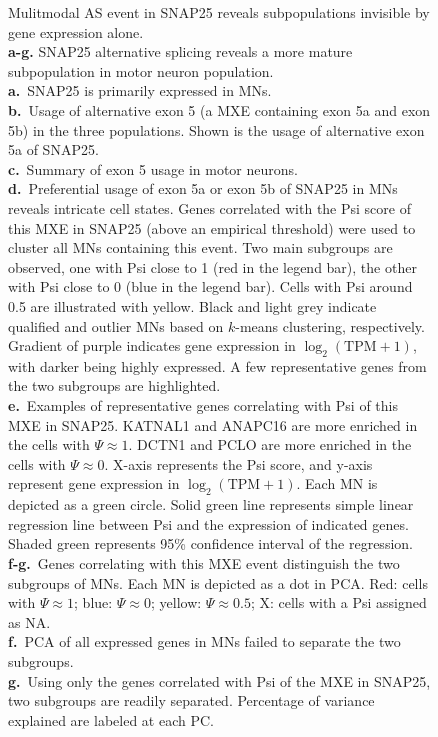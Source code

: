 \clearpage
\thispagestyle{facingcaption}
\begin{figure}[h]
\captionsetup{labelformat=prev-page}
\caption[Mulitmodal AS event in SNAP25 reveals subpopulations invisible by gene expression alone.]{Mulitmodal AS event in SNAP25 reveals subpopulations invisible by gene expression alone.\\
\textbf{a-g.} SNAP25 alternative splicing reveals a more mature subpopulation in motor neuron population.\\
\textbf{a.}~SNAP25 is primarily expressed in MNs. \\
\textbf{b.}~Usage of alternative exon 5 (a MXE containing exon 5a and exon 5b) in the three populations. Shown is the usage of alternative exon 5a of SNAP25. \\
\textbf{c.}~Summary of exon 5 usage in motor neurons.\\
\textbf{d.}~Preferential usage of exon 5a or exon 5b of SNAP25 in MNs reveals intricate cell states. Genes correlated with the Psi score of this MXE in SNAP25 (above an empirical threshold) were used to cluster all MNs containing this event. Two main subgroups are observed, one with Psi close to 1 (red in the legend bar), the other with Psi close to 0 (blue in the legend bar). Cells with Psi around 0.5 are illustrated with yellow. Black and light grey indicate qualified and outlier MNs based on $k$-means clustering, respectively. Gradient of purple indicates gene expression in $\log_2(\text{TPM}+1)$, with darker being highly expressed. A few representative genes from the two subgroups are highlighted. \\
\textbf{e.}~Examples of representative genes correlating with Psi of this MXE in SNAP25. KATNAL1 and ANAPC16 are more enriched in the cells with $\Psi \approx 1$. DCTN1 and PCLO are more enriched in the cells with $\Psi \approx 0$. X-axis represents the Psi score, and y-axis represent gene expression in $\log_2(\text{TPM}+1)$. Each MN is depicted as a green circle. Solid green line represents simple linear regression line between Psi and the expression of indicated genes. Shaded green represents 95\% confidence interval of the regression.\\
\textbf{f-g.}~Genes correlating with this MXE event distinguish the two subgroups of MNs. Each MN is depicted as a dot in PCA.  Red: cells with $\Psi \approx 1$; blue: $\Psi \approx 0$; yellow: $\Psi \approx 0.5$; X: cells with a Psi assigned as NA.\\
\textbf{f.}~PCA of all expressed genes in MNs failed to separate the two subgroups.\\
\textbf{g.}~Using only the genes correlated with Psi of the MXE in SNAP25, two subgroups are readily separated. Percentage of variance explained are labeled at each PC.\\
}
\label{fig:hidden_cell_states_part1}
\end{figure}
